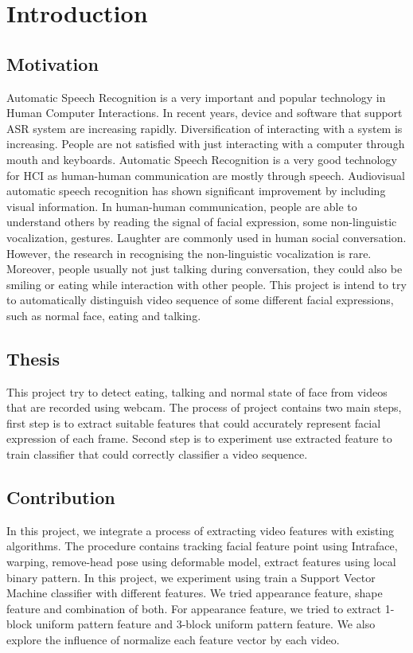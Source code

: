 \chapter{Introduction}
\section{Motivation}
Automatic Speech Recognition is a very important and popular technology in Human Computer Interactions. In recent years, device and software that support ASR system are increasing rapidly. Diversification of interacting with a system is increasing. People are not satisfied with just interacting with a computer through mouth and keyboards. Automatic Speech Recognition is a very good technology for HCI as human-human communication are mostly through speech. Audiovisual automatic speech recognition has shown significant improvement by including visual information. In human-human communication, people are able to understand others by reading the signal of facial expression, some non-linguistic vocalization, gestures. \cite{petridis2011prediction} Laughter are commonly used in human social conversation. However, the research in recognising the non-linguistic vocalization is rare. Moreover, people usually not just talking during conversation, they could also be smiling or eating while interaction with other people. This project is intend to try to automatically distinguish video sequence of some different facial expressions, such as normal face, eating and talking.
\section{Thesis}
This project try to detect eating, talking and normal state of face from videos that are recorded using webcam. The process of project contains two main steps, first step is to extract suitable features that could accurately represent facial expression of each frame. Second step is to experiment use extracted feature to train classifier that could correctly classifier a video sequence.
\section{Contribution}
In this project, we integrate a process of extracting video features with existing algorithms. The procedure contains tracking facial feature point using Intraface, warping, remove-head pose using deformable model, extract features using local binary pattern.
In this project, we experiment using train a Support Vector Machine classifier with different features. We tried appearance feature, shape feature and combination of both. For appearance feature, we tried to extract 1-block uniform pattern feature and 3-block uniform pattern feature. We also explore the influence of normalize each feature vector by each video.
